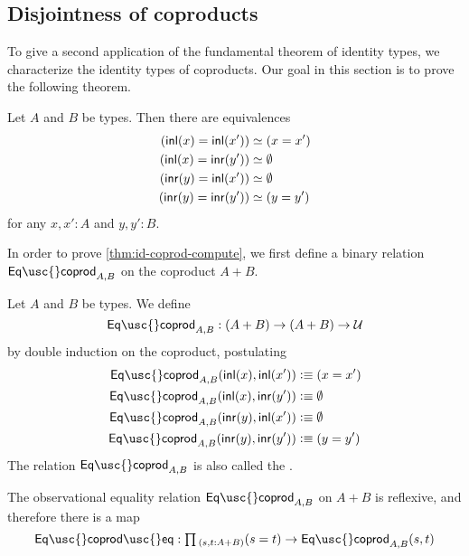 \subsection{Disjointness of coproducts}

To give a second application of the fundamental theorem of identity types, we characterize the identity types of coproducts. Our goal in this section is to prove the following theorem.

\begin{thm}\label{thm:id-coprod-compute}
Let $A$ and $B$ be types. Then there are equivalences
\begin{align*}
({\mathsf{inl}}(x)={\mathsf{inl}}(x')) & \simeq (x = x')\\
({\mathsf{inl}}(x)={\mathsf{inr}}(y')) & \simeq \emptyset \\
({\mathsf{inr}}(y)={\mathsf{inl}}(x')) & \simeq \emptyset \\
({\mathsf{inr}}(y)={\mathsf{inr}}(y')) & \simeq (y=y')
\end{align*}
for any $x,x':A$ and $y,y':B$.
\end{thm}

In order to prove \cref{thm:id-coprod-compute}, we first define
a binary relation $\mathsf{Eq\usc{}coprod}_{A,B}$ on the coproduct $A+B$.

\begin{defn}
Let $A$ and $B$ be types. We define 
\begin{equation*}
\mathsf{Eq\usc{}coprod}_{A,B} : (A+B)\to (A+B)\to\UU
\end{equation*}
by double induction on the coproduct, postulating
\begin{align*}
\mathsf{Eq\usc{}coprod}_{A,B}(\inl(x),\inl(x')) & \defeq (x=x') \\
\mathsf{Eq\usc{}coprod}_{A,B}(\inl(x),\inr(y')) & \defeq \emptyt \\
\mathsf{Eq\usc{}coprod}_{A,B}(\inr(y),\inl(x')) & \defeq \emptyt \\
\mathsf{Eq\usc{}coprod}_{A,B}(\inr(y),\inr(y')) & \defeq (y=y')
\end{align*}
The relation $\mathsf{Eq\usc{}coprod}_{A,B}$ is also called the .
\end{defn}

\begin{lem}
The observational equality relation $\mathsf{Eq\usc{}coprod}_{A,B}$ on $A+B$ is reflexive, and therefore there is a map
\begin{equation*}
\mathsf{Eq\usc{}coprod\usc{}eq}:\prd{s,t:A+B} (s=t)\to \mathsf{Eq\usc{}coprod}_{A,B}(s,t)
\end{equation*}
\end{lem}

